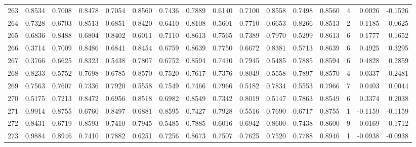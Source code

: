 \begin{tabular}{lrrrrrrrrrrrrrrr}
263 &      0.8534 &  0.7008 &  0.8478 &  0.7054 &  0.8560 &  0.7436 &  0.7889 &  0.6140 &  0.7100 &  0.8558 &   0.7498 &     0.8560 &      4 &                    0.0026 &                    -0.1526 \\
264 &      0.7328 &  0.6703 &  0.8513 &  0.6851 &  0.8420 &  0.6410 &  0.8108 &  0.5601 &  0.7710 &  0.6653 &   0.8266 &     0.8513 &      2 &                    0.1185 &                    -0.0625 \\
265 &      0.6836 &  0.8488 &  0.6804 &  0.8402 &  0.6011 &  0.7110 &  0.8613 &  0.7565 &  0.7389 &  0.7970 &   0.5299 &     0.8613 &      6 &                    0.1777 &                     0.1652 \\
266 &      0.3714 &  0.7009 &  0.8486 &  0.6841 &  0.8454 &  0.6759 &  0.8639 &  0.7750 &  0.6672 &  0.8381 &   0.5713 &     0.8639 &      6 &                    0.4925 &                     0.3295 \\
267 &      0.3766 &  0.6625 &  0.8323 &  0.5438 &  0.7807 &  0.6752 &  0.8594 &  0.7410 &  0.7945 &  0.5485 &   0.7885 &     0.8594 &      6 &                    0.4828 &                     0.2859 \\
268 &      0.8233 &  0.5752 &  0.7698 &  0.6785 &  0.8570 &  0.7520 &  0.7617 &  0.7376 &  0.8049 &  0.5558 &   0.7897 &     0.8570 &      4 &                    0.0337 &                    -0.2481 \\
269 &      0.7563 &  0.7607 &  0.7336 &  0.7920 &  0.5558 &  0.7549 &  0.7466 &  0.7966 &  0.5182 &  0.7834 &   0.5553 &     0.7966 &      7 &                    0.0403 &                     0.0044 \\
270 &      0.5175 &  0.7213 &  0.8472 &  0.6956 &  0.8518 &  0.6982 &  0.8549 &  0.7342 &  0.8019 &  0.5147 &   0.7863 &     0.8549 &      6 &                    0.3374 &                     0.2038 \\
271 &      0.9914 &  0.8755 &  0.6760 &  0.8497 &  0.6881 &  0.8595 &  0.7427 &  0.7928 &  0.5516 &  0.7690 &   0.6717 &     0.8755 &      1 &                   -0.1159 &                    -0.1159 \\
272 &      0.8431 &  0.6719 &  0.8593 &  0.7410 &  0.7945 &  0.5485 &  0.7885 &  0.6016 &  0.6942 &  0.8600 &   0.7438 &     0.8600 &      9 &                    0.0169 &                    -0.1712 \\
273 &      0.9884 &  0.8946 &  0.7410 &  0.7882 &  0.6251 &  0.7256 &  0.8673 &  0.7507 &  0.7625 &  0.7520 &   0.7788 &     0.8946 &      1 &                   -0.0938 &                    -0.0938 \\

\end{tabular}
